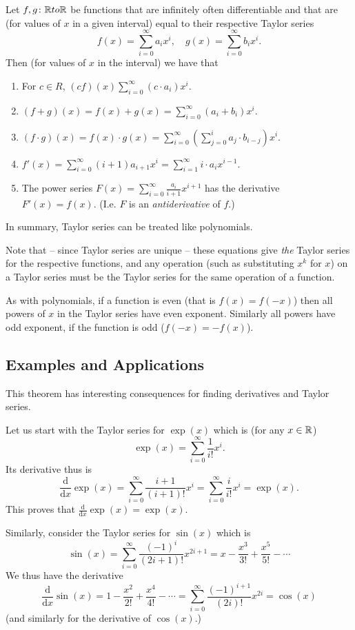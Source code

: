 \begin{thm}
Let $f,g\colon{\mathbb R} to{\mathbb R}$ be functions that are infinitely often differentiable
and that are (for values of $x$ in a given interval) equal to their
respective Taylor series
\[
f(x)=\sum_{i=0}^\infty a_i x^i,\quad
g(x)=\sum_{i=0}^\infty b_i x^i.
\]
Then (for values of $x$ in the interval) we have that
\begin{enumerate}
\item For $c\in R$, $(cf)(x)\sum_{i=0}^\infty (c\cdot a_i)x^i$.
\item $(f+g)(x)=f(x)+g(x)=\sum_{i=0}^\infty (a_i+b_i) x^i$.
\item $(f\cdot g)(x)=f(x)\cdot g(x)=\sum_{i=0}^\infty \left(\sum_{j=0}^i
a_j\cdot b_{i-j}\right) x^i$.
\item $f'(x)=\sum_{i=0}^\infty (i+1)a_{i+1}x^i
=\sum_{i=1}^\infty i\cdot a_i x^{i-1}$.
\item The power series $F(x)=\sum_{i=0}^\infty \frac{a_i}{i+1} x^{i+1}$ has
the derivative $F'(x)=f(x)$. (I.e. $F$ is an {\em antiderivative} of $f$.)
\end{enumerate}
In summary, Taylor series can be treated like polynomials.
\end{thm}
Note that -- since Taylor series are unique -- these equations give {\em the}
Taylor series for the respective functions, and any operation (such as
substituting $x^k$ for $x$) on a Taylor series must be the Taylor series for
the same operation of a function.
\medskip

As with polynomials, if a function is even (that is $f(x)=f(-x)$) then all
powers of $x$ in the Taylor series have even exponent. Similarly all
powers have odd exponent, if the function is odd ($f(-x)=-f(x)$).

\subsection{Examples and Applications}

This theorem has interesting consequences for finding derivatives and Taylor
series.

Let us start with the Taylor series for $\exp(x)$ which is (for any
$x\in{\mathbb R}$)
\[
\exp(x)=\sum_{i=0}^\infty \frac{1}{i!} x^i.
\]
Its derivative thus is
\[
\frac{\mbox{d}}{\mbox{d}x}
\exp(x)=\sum_{i=0}^\infty \frac{i+1}{(i+1)!} x^i
=\sum_{i=0}^\infty \frac{i}{i!} x^i=\exp(x).
\]
This proves that $\frac{\mbox{d}}{\mbox{d}x}\exp(x)=\exp(x)$.
\smallskip

Similarly, consider the Taylor series for $\sin(x)$ which is
\[
\sin(x)=\sum_{i=0}^\infty
\frac{(-1)^i}{(2i+1)!}x^{2i+1}=x-\frac{x^3}{3!}+\frac{x^5}{5!}-\cdots
\]
We thus have the derivative
\[
\frac{\mbox{d}}{\mbox{d}x}
\sin(x)=
1-\frac{x^2}{2!}+\frac{x^4}{4!}-\cdots
=\sum_{i=0}^\infty \frac{(-1)^{i+1}}{(2i)!}x^{2i}=\cos(x)
\]
(and similarly for the derivative of $\cos(x)$.)

